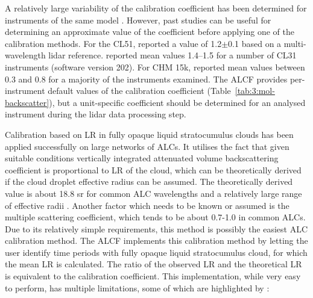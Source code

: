 \begin{table}
\caption[Theoretical molecular backscatter and the calibration coefficient]{
Theoretical molecular volume backscattering coefficient calculated at pressure 1000 hPa and
temperature 20 \unit{^\circ C} and the calibration coefficient,
relative to the instrument native units, determined
for the instrument based on the molecular volume backscattering coefficient and
stratocumulus lidar ratio calibration methods.
}
\label{tab:3:mol-backscatter}
\centerline{}
\end{table}

A relatively large variability of the calibration coefficient has been determined
for instruments of the same model \citep{hopkin2019}. However, past studies
can be useful for determining an approximate value of the coefficient
before applying one of the calibration methods. For the CL51, \cite{jin2015}
reported a value of 1.2$\pm$0.1 based on a multi-wavelength lidar reference.
\cite{hopkin2019} reported mean values 1.4--1.5 for a number of CL31 instruments
(software version 202). For CHM 15k, \cite{hopkin2019} reported mean values
between 0.3 and 0.8 for a majority of the instruments examined. The ALCF provides
per-instrument default values of the calibration coefficient
(Table~\ref{tab:3:mol-backscatter}), but a unit-specific coefficient should be determined
for an analysed instrument during the lidar data processing step.

Calibration based on LR in fully opaque liquid stratocumulus clouds
has been applied successfully on large networks of ALCs. It utilises the
fact that given suitable conditions vertically integrated attenuated volume backscattering coefficient is
proportional to LR of the cloud, which can be theoretically derived
if the cloud droplet effective radius can be assumed. The theoretically derived
value is about 18.8 sr for common ALC wavelengths and a relatively large
range of effective radii \citep{oconnor2004}. Another factor which needs to be known or assumed
is the multiple scattering coefficient, which tends to be about 0.7-1.0 in common
ALCs. Due to its relatively simple requirements, this method is possibly the
easiest ALC calibration method. The ALCF implements this calibration method by
letting the user identify time periods with fully opaque liquid stratocumulus cloud,
for which the mean LR is calculated. The ratio of the observed LR and
the theoretical LR is equivalent to the calibration coefficient. This implementation,
while very easy to perform, has multiple limitations, some of which are
highlighted by \cite{hopkin2019}:


